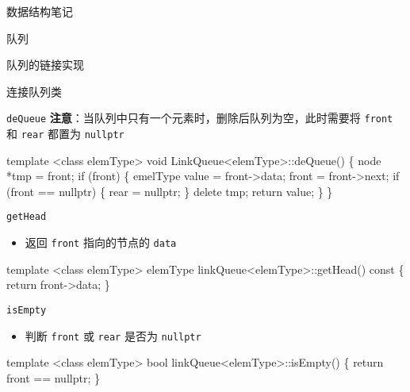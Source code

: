 \documentclass[
  ignorenonframetext,
]{beamer}
\newenvironment{Shaded}{}{}
\newcommand{\NormalTok}[1]{#1}
\providecommand{\tightlist}{%
  \setlength{\itemsep}{0pt}\setlength{\parskip}{0pt}}
\begin{document}
\begin{frame}[fragile]{数据结构笔记}
\begin{block}{队列}
\begin{block}{队列的链接实现}
\begin{block}{连接队列类}
\begin{block}{\texttt{deQueue}}
\textbf{注意}：当队列中只有一个元素时，删除后队列为空，此时需要将
\texttt{front} 和 \texttt{rear} 都置为 \texttt{nullptr}

\begin{Shaded}
\begin{Highlighting}[]
\NormalTok{template \textless{}class elemType\textgreater{}}
\NormalTok{void LinkQueue\textless{}elemType\textgreater{}::deQueue()}
\NormalTok{\{}
\NormalTok{  node *tmp = front;}
\NormalTok{  if (front)}
\NormalTok{  \{}
\NormalTok{    emelType value = front{-}\textgreater{}data;}
\NormalTok{    front = front{-}\textgreater{}next;}
\NormalTok{    if (front == nullptr)}
\NormalTok{    \{}
\NormalTok{      rear = nullptr;}
\NormalTok{    \}}
\NormalTok{    delete tmp;}
\NormalTok{    return value;}
\NormalTok{  \}}
\NormalTok{\}}
\end{Highlighting}
\end{Shaded}
\end{block}

\begin{block}{\texttt{getHead}}
\protect{}\label{gethead-1}
\begin{itemize}
\tightlist
\item
  返回 \texttt{front} 指向的节点的 \texttt{data}
\end{itemize}

\begin{Shaded}
\begin{Highlighting}[]
\NormalTok{template \textless{}class elemType\textgreater{}}
\NormalTok{elemType linkQueue\textless{}elemType\textgreater{}::getHead() const}
\NormalTok{\{}
\NormalTok{  return front{-}\textgreater{}data;}
\NormalTok{\}}
\end{Highlighting}
\end{Shaded}
\end{block}

\begin{block}{\texttt{isEmpty}}
\protect{}\label{isempty-3}
\begin{itemize}
\tightlist
\item
  判断 \texttt{front} 或 \texttt{rear} 是否为 \texttt{nullptr}
\end{itemize}

\begin{Shaded}
\begin{Highlighting}[]
\NormalTok{template \textless{}class elemType\textgreater{}}
\NormalTok{bool linkQueue\textless{}elemType\textgreater{}::isEmpty()}
\NormalTok{\{}
\NormalTok{  return front == nullptr;}
\NormalTok{\}}
\end{Highlighting}
\end{Shaded}
\end{block}


\end{block}
\end{block}
\end{block}
\end{frame}
\end{document}
